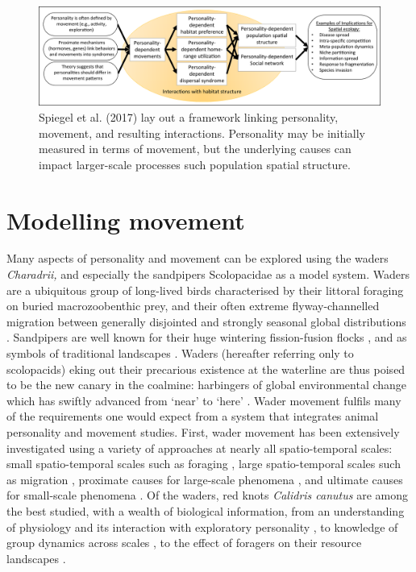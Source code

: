 \begin{figure}

    \includegraphics[width=0.7\linewidth]{fig01_spiegel_etal_2017.png}
    \caption{Spiegel et al. (2017) lay out a framework linking personality,
  movement, and resulting interactions. Personality may be initially
  measured in terms of movement, but the underlying causes can impact
  larger-scale processes such population spatial
  structure.}
    \label{fig:fig01_spiegel_etal_2017}
\end{figure}

\section{Modelling movement}

Many aspects of personality and movement can be explored using the waders \emph{Charadrii,} and especially the sandpipers Scolopacidae as a model system. Waders are a ubiquitous group of long-lived birds characterised by their littoral foraging on buried macrozoobenthic prey, and their often extreme flyway-channelled migration between generally disjointed and strongly seasonal global distributions \citep{boere2006a, gill2009, piersma2019}. Sandpipers are well known for their huge wintering fission-fusion flocks \citep{myers1983, conklin2008}, and as symbols of traditional landscapes \citep{colwell2018}. Waders (hereafter referring only to scolopacids) eking out their precarious existence at the waterline are thus poised to be the new canary in the coalmine: harbingers of global environmental change \citep{piersma2004, wikelski2016, fitzpatrick2018} which has swiftly advanced from `near' to `here' \citep{ipcc2018}. Wader movement fulfils many of the requirements one would expect from a system that integrates animal personality and movement studies. First, wader movement has been extensively investigated using a variety of approaches at nearly all spatio-temporal scales: small spatio-temporal scales such as foraging \citep{vangils2003, vangils2010}, large spatio-temporal scales such as migration \citep{buehler2006, piersma2011}, proximate causes for large-scale phenomena \citep{lank2003, ydenberg2004, ruthrauff2013, ruthrauff2018}, and ultimate causes for small-scale phenomena \citep{vangils2006, kraan2009}. Of the waders, red knots \emph{Calidris canutus} are among the best studied, with a wealth of biological information, from an understanding of physiology and its interaction with exploratory personality \citep{bijleveld2014, mathot2017}, to knowledge of group dynamics across scales \citep{bijleveld2010, bijleveld2012a, bijleveld2015b}, to the effect of foragers on their resource landscapes \citep{bijleveld2015c}.

